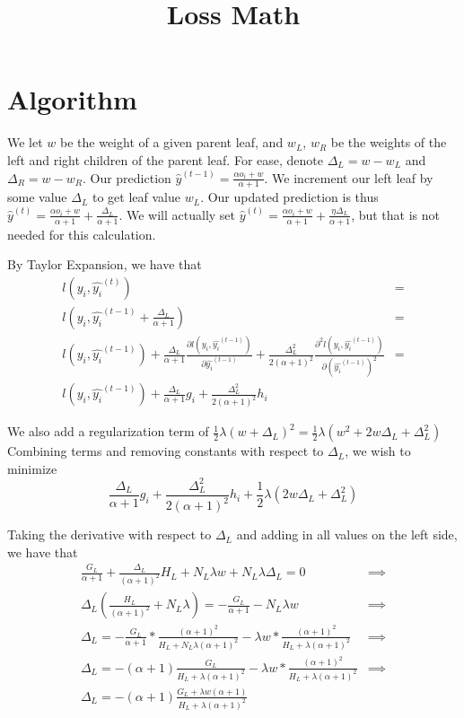 \documentclass{article}
\begin{document}
\title{Loss Math}
\author{}
\date{}

\maketitle

\section*{Algorithm}
We let $w$ be the weight of a given parent leaf, and $w_L$, $w_R$ be the weights of the left and right children of the parent leaf. 
For ease, denote $\Delta_L = w - w_L$ and $\Delta_R = w - w_R$. Our prediction $\hat{y}^{(t - 1)} = \frac{\alpha o_i + w}{\alpha + 1}$. 
We increment our left leaf by some value $\Delta_L$ to get leaf value $w_L$. Our updated prediction is thus
$\hat{y}^{(t)} = \frac{\alpha o_i + w}{\alpha + 1} + \frac{\Delta_L}{\alpha + 1}$. We will actually set $\hat{y}^{(t)} = \frac{\alpha o_i + w}{\alpha + 1} + \frac{\eta \Delta_L}{\alpha + 1}$, 
but that is not needed for this calculation.

By Taylor Expansion, we have that \begin{align*}
    l(y_i, \hat{y_i}^{(t)}) &= \\
    l(y_i, \hat{y_i}^{(t - 1)} + \frac{\Delta_L}{\alpha + 1}) &= \\
    l(y_i, \hat{y_i}^{(t - 1)}) + \frac{\Delta_L}{\alpha + 1} \frac{\partial l(y_i, \hat{y_i}^{(t - 1)})}{\partial \hat{y_i}^{(t - 1)}} + \frac{\Delta_L^2}{2 (\alpha + 1)^2} \frac{\partial^2 l(y_i, \hat{y_i}^{(t - 1)})}{\partial (\hat{y_i}^{(t - 1)})^2}&= \\
    l(y_i, \hat{y_i}^{(t - 1)}) + \frac{\Delta_L}{\alpha + 1} g_i + \frac{\Delta_L^2}{2 (\alpha + 1)^2} h_i
\end{align*}

We also add a regularization term of $\frac{1}{2}\lambda(w + \Delta_L)^2 = \frac{1}{2} \lambda (w^2 + 2w\Delta_L + \Delta_L^2)$
Combining terms and removing constants with respect to $\Delta_L$, we wish to minimize \[
 \frac{\Delta_L}{\alpha + 1} g_i + \frac{\Delta_L^2}{2(\alpha + 1)^2} h_i + \frac{1}{2} \lambda (2w\Delta_L + \Delta_L^2)
\]

Taking the derivative with respect to $\Delta_L$ and adding in all values on the left side, we have that \begin{align*}
    \frac{G_L}{\alpha + 1} + \frac{\Delta_L}{(\alpha + 1)^2} H_L + N_L \lambda w + N_L \lambda \Delta_L = 0 &\implies \\
    \Delta_L \left(\frac{H_L}{(\alpha + 1)^2} + N_L \lambda \right) = -\frac{G_L}{\alpha + 1} - N_L \lambda w &\implies \\
    \Delta_L = - \frac{G_L}{\alpha + 1} * \frac{(\alpha + 1)^2}{H_L + N_L \lambda(\alpha + 1)^2} - \lambda w *  \frac{(\alpha + 1)^2}{H_L + \lambda(\alpha + 1)^2} &\implies \\ 
    \Delta_L = - (\alpha + 1) \frac{G_L}{H_L + \lambda (\alpha + 1)^2} - \lambda w *  \frac{(\alpha + 1)^2}{H_L + \lambda(\alpha + 1)^2} &\implies \\
    \Delta_L = - (\alpha + 1) \frac{G_L + \lambda w (\alpha + 1)}{H_L + \lambda (\alpha + 1)^2}
\end{align*}
\end{document}
